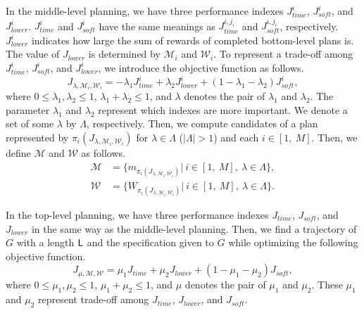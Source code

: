 \documentclass[journal,twoside,web]{IEEEtran}
\newcommand{\Len}{{\sf L}}
\newcommand{\M}{\mathcal{M}}
\newcommand{\W}{\mathcal{W}}
\begin{document}
In the middle-level planning, we have three performance indexes $J_{time}^i$, $J_{soft}^i$, and $J_{lower}^i$.
$J_{time}^i$ and $J_{soft}^i$ have the same meanings as $J_{time}^{i,j_i}$ and $J_{soft}^{i,j_i}$, respectively.
$J_{lower}^i$ indicates how large the sum of rewards of completed bottom-level plans is.
The value of $J_{lower}$ is determined by $\M_i$ and $\W_i$.
To represent a trade-off among $J_{time}^i$, $J_{soft}^i$, and $J_{lower}^i$, we introduce the objective function as follows.
\[
J_{\lambda,\M_i,\W_i}=-\lambda_1 J_{time}^i + \lambda_2J_{lower}^i+ (1-\lambda_1-\lambda_2)J_{soft}^i,
\]
where $0\leq\lambda_1,{\lambda}_2\leq1$, $\lambda_1+{\lambda}_2\leq1$, and $\lambda$ denotes the pair of $\lambda_1$ and $\lambda_2$.
The parameter $\lambda_1$ and ${\lambda}_2$ represent which indexes are more important.
%
We denote a set of some $\lambda$ by $\Lambda$, respectively.
Then, we compute candidates of a plan represented by $\pi_{i}(J_{\lambda,\M_i,\W_i})$ for $\lambda\in\Lambda$ ($|\Lambda|>1$) and each $i\in[1,~M]$.
Then, we define $\mathcal{M}$ and $\mathcal{W}$ as follows.
\begin{align}
\mathcal{M}&=\{m_{\pi_{i}(J_{\lambda,\M_i,\W_i})}|~i\in[1,~M],~\lambda\in \Lambda\},\\
\mathcal{W}&=\{W_{\pi_{i}(J_{\lambda,\M_i,\W_i})}|~i\in[1,~M],~\lambda\in \Lambda\}.
\end{align}
%

In the top-level planning, we have three performance indexes $J_{time}$, $J_{soft}$, and $J_{lower}$ in the same way as the middle-level planning.
Then, we find a trajectory of $G$ with a length $\Len$ and the specification given to $G$ while optimizing the following objective function.
\[
J_{\mu,\M,\W} = \mu_1 J_{time}+ \mu_2 J_{lower} + (1-\mu_1-\mu_2)J_{soft},
\]
where $0\leq\mu_1,{\mu}_2\leq1$, $\mu_1+{\mu}_2\leq1$, and $\mu$ denotes the pair of $\mu_1$ and $\mu_2$.
These $\mu_1$ and $\mu_2$ represent trade-off among $J_{time}$, $J_{lower}$, and $J_{soft}$.
\end{document}
